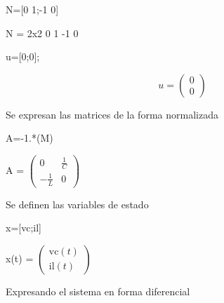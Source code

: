\documentclass[10pt,a4paper]{article} %
\begin{document}
	\begin{matlabcode}
		N=[0 1;-1 0]
	\end{matlabcode}
	\begin{matlaboutput}
		N = 2x2    
		0     1
		-1     0
		
	\end{matlaboutput}
	\begin{matlabcode}
		u=[0;0]; 
	\end{matlabcode}
	
	\begin{par}
		$$u=\begin{pmatrix}
		0\\0
		\end{pmatrix}$$
	\end{par}
	
	\begin{par}
		\begin{flushleft}
			Se expresan las matrices de la forma normalizada
		\end{flushleft}
	\end{par}
	
	\begin{matlabcode}
		A=-1.*(M\N)
	\end{matlabcode}
	\begin{matlabsymbolicoutput}
		A = 
		$\displaystyle \left(\begin{array}{cc}
		0 & \frac{1}{C}\\
		-\frac{1}{L} & 0
		\end{array}\right)$
	\end{matlabsymbolicoutput}
	
	\begin{par}
		\begin{flushleft}
			Se definen las variables de estado
		\end{flushleft}
	\end{par}
	
	\begin{matlabcode}
		x=[vc;il]
	\end{matlabcode}
	\begin{matlabsymbolicoutput}
		x(t) = 
		$\displaystyle \left(\begin{array}{c}
		\textrm{vc}\left(t\right)\\
		\textrm{il}\left(t\right)
		\end{array}\right)$
	\end{matlabsymbolicoutput}
	
	\begin{par}
		\begin{flushleft}
			Expresando el sistema en forma diferencial
		\end{flushleft}
	\end{par}
	
\end{document}
